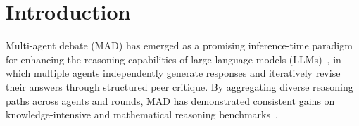 \section{Introduction}
\label{sec:introduction}
Multi-agent debate (MAD) has emerged as a promising inference-time paradigm for enhancing the reasoning capabilities of large language models (LLMs)~\cite{chen2024reconcile:mad-1,du2024multiagentdebate:mad-2}, in which multiple agents independently generate responses and iteratively revise their answers through structured peer critique. By aggregating diverse reasoning paths across agents and rounds, MAD has demonstrated consistent gains on knowledge-intensive and mathematical reasoning benchmarks~\cite{liang2024encouraging:mad-3}.


